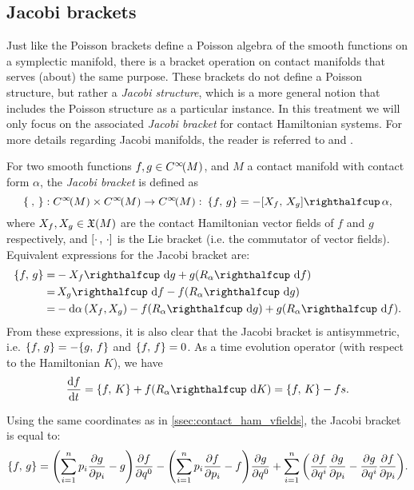 \subsection{Jacobi brackets}
Just like the Poisson brackets define a Poisson algebra of the smooth functions on a symplectic manifold, there is a bracket operation on contact manifolds that serves (about) the same purpose. These brackets do not define a Poisson structure, but rather a \emph{Jacobi structure}, which is a more general notion that includes the Poisson structure as a particular instance. In this treatment we will only focus on the associated \emph{Jacobi bracket} for contact Hamiltonian systems. For more details regarding Jacobi manifolds, the reader is referred to \cite[chap. V]{Libermann1987} and \cite{DeLeon2020}.

For two smooth functions \(f, g \in C^\infty\!\qty(M)\), and \(M\) a contact manifold with contact form \(\alpha\), the \emph{Jacobi bracket} is defined as
\begin{equation}
    \jacobi{\:}{}: \functions{M} \times \functions{M} \to \functions{M}:\: \jacobi{f}{g} = -\intpr{\liebr{X_f}{X_g}}{\alpha},
\end{equation}
where \(X_f, X_g \in \mathfrak{X}\qty(M)\) are the contact Hamiltonian vector fields of \(f\) and \(g\) respectively, and \(\qty[\cdot\,,\,\cdot]\) is the Lie bracket (i.e. the commutator of vector fields). Equivalent expressions for the Jacobi bracket are: \cite{Libermann1987}
\begin{equation}
    \begin{split}
        \jacobi{f}{g} =& -\intpr{X_f}{\dd{g}} + g(\intpr{R_\alpha}{\dd{f}}) \\
                      =& \, \intpr{X_g}{\dd{f}} - f(\intpr{R_\alpha}{\dd{g}}) \\
                      =& -\dd{\alpha}(X_f, X_g) - f(\intpr{R_\alpha}{\dd{g}}) + g(\intpr{R_\alpha}{\dd{f}}).\\
    \end{split}
\end{equation}
From these expressions, it is also clear that the Jacobi bracket is antisymmetric, i.e. \(\{f,\,g\} = - \{g,\,f\}\) and \(\{f,\,f\} = 0\). As a time evolution operator (with respect to the Hamiltonian \(K\)), we have
\begin{equation}
     \dv{f}{t} = \jacobi{f}{K} + f(\intpr{R_\alpha}{\dd{K}}) = \jacobi{f}{K} - fs.
\end{equation}

Using the same coordinates as in \cref{ssec:contact_ham_vfields}, the Jacobi bracket is equal to:
\begin{equation}
     \{f,\,g\} = \qty(\sum_{i=1}^n p_i \pdv{g}{p_i} - g)\pdv{f}{q^0} - \qty(\sum_{i=1}^n p_i \pdv{f}{p_i} - f)\pdv{g}{q^0} 
    + \sum_{i=1}^n\qty(\pdv{f}{q^i}\pdv{g}{p_i} - \pdv{g}{q^i}\pdv{f}{p_i}).
\end{equation}

